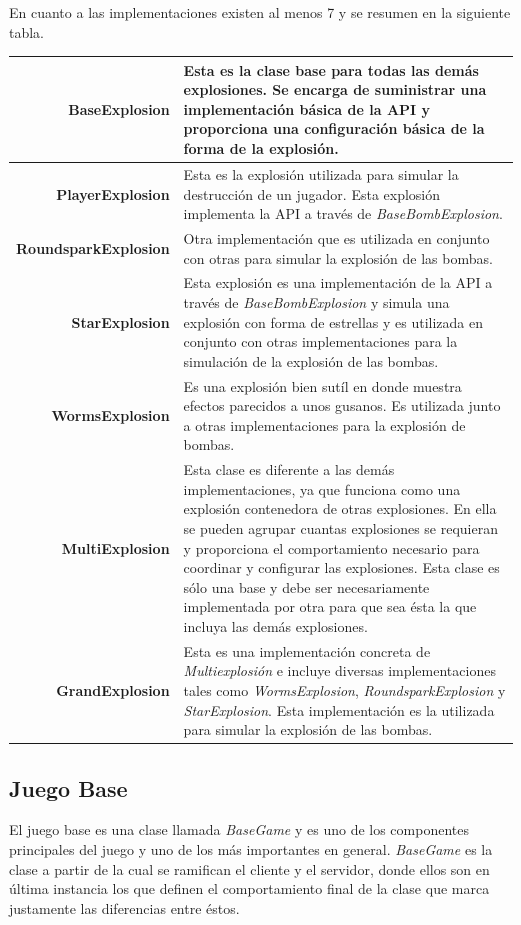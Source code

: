 \documentclass[a4paper,12pt,openany,oneside]{book}
\begin{document}
En cuanto a las implementaciones existen al menos 7 y se resumen en la siguiente tabla.
\begin{flushleft}
\begin{tabular}{|r|p{9cm}|}
\hline
\textbf{BaseExplosion} & Esta es la clase base para todas las demás explosiones. Se encarga de suministrar una implementación básica de la API y proporciona una configuración básica de la forma de la explosión.\\
\hline
\textbf{PlayerExplosion} & Esta es la explosión utilizada para simular la destrucción de un jugador. Esta explosión implementa la API a través de \textit{BaseBombExplosion}. \\
\hline
\textbf{RoundsparkExplosion} & Otra implementación que es utilizada en conjunto con otras para simular la explosión de las bombas. \\
\hline
\textbf{StarExplosion} & Esta explosión es una implementación de la API a través de \textit{BaseBombExplosion} y simula una explosión con forma de estrellas y es utilizada en conjunto con otras implementaciones para la simulación de la explosión de las bombas. \\
\hline
\textbf{WormsExplosion} & Es una explosión bien sutíl en donde muestra efectos parecidos a unos gusanos. Es utilizada junto a otras implementaciones para la explosión de bombas. \\
\hline
\textbf{MultiExplosion} & Esta clase es diferente a las demás implementaciones, ya que funciona como una explosión contenedora de otras explosiones. En ella se pueden agrupar cuantas explosiones se requieran y proporciona el comportamiento necesario para coordinar y configurar las explosiones. Esta clase es sólo una base y debe ser necesariamente implementada por otra para que sea ésta la que incluya las demás explosiones.\\
\hline
\textbf{GrandExplosion} & Esta es una implementación concreta de \textit{Multiexplosión} e incluye diversas implementaciones tales como \textit{WormsExplosion}, \textit{RoundsparkExplosion} y \textit{StarExplosion}. Esta implementación es la utilizada para simular la explosión de las bombas.\\
\hline
\end{tabular}
\end{flushleft}
\subsection{Juego Base}
El juego base es una clase llamada \textit{BaseGame} y es uno de los componentes principales del juego y uno de los más importantes en general. \textit{BaseGame} es la clase a partir de la cual se ramifican el cliente y el servidor, donde ellos son en última instancia los que definen el comportamiento final de la clase que marca justamente las diferencias entre éstos.
\end{document}
